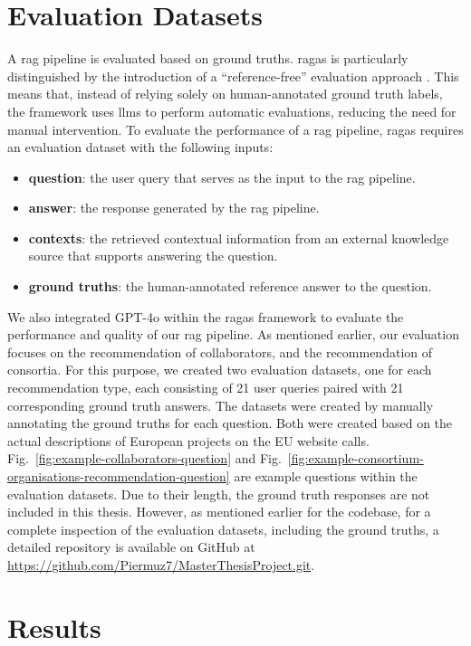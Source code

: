 \section{Evaluation Datasets}\label{sec:evaluation-datasets}
A \gls{rag} pipeline is evaluated based on ground truths.
\gls{ragas} is particularly distinguished by the introduction of a ``reference-free'' evaluation approach \cite{ragas2024}.
This means that, instead of relying solely on human-annotated ground truth labels, the framework uses \glspl{llm} to perform automatic evaluations, reducing the need for manual intervention.
To evaluate the performance of a \gls{rag} pipeline, \gls{ragas} requires an evaluation dataset with the following inputs:
\begin{itemize}
    \item \textbf{question}: the user query that serves as the input to the \gls{rag} pipeline.
	\item \textbf{answer}: the response generated by the \gls{rag} pipeline.
	\item \textbf{contexts}: the retrieved contextual information from an external knowledge source that supports answering the question.
	\item \textbf{ground truths}: the human-annotated reference answer to the question.
\end{itemize}

We also integrated GPT-4o within the \gls{ragas} framework to evaluate the performance and quality of our \gls{rag} pipeline.
As mentioned earlier, our evaluation focuses on the recommendation of collaborators, and the recommendation of consortia.
For this purpose, we created two evaluation datasets, one for each recommendation type, each consisting of 21 user queries paired with 21 corresponding ground truth answers.
The datasets were created by manually annotating the ground truths for each question.
Both were created based on the actual descriptions of European projects on the EU website calls.
Fig.~\ref{fig:example-collaborators-question} and Fig.~\ref{fig:example-consortium-organisations-recommendation-question} are example questions within the evaluation datasets.
Due to their length, the ground truth responses are not included in this thesis.
However, as mentioned earlier for the codebase, for a complete inspection of the evaluation datasets, including the ground truths, a detailed repository is available on GitHub at \url{https://github.com/Piermuz7/MasterThesisProject.git}.

\section{Results}\label{sec:results}

